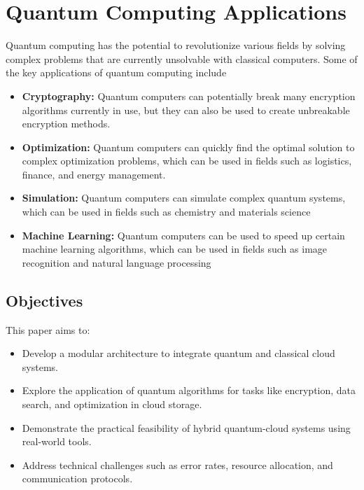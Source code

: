 \documentclass[12pt,a4paper]{article}
\begin{document}
\section{Quantum Computing Applications}
Quantum computing has the potential to revolutionize various fields by solving complex problems that are currently unsolvable
with classical computers. Some of the key applications of quantum computing include
\begin{itemize}
\item \textbf{Cryptography:} Quantum computers can potentially break many encryption algorithms currently in
use, but they can also be used to create unbreakable encryption methods.
\item \textbf{Optimization:} Quantum computers can quickly find the optimal solution to complex
optimization problems, which can be used in fields such as logistics, finance, and energy management.
\item \textbf{Simulation:} Quantum computers can simulate complex quantum systems, which can be used in
fields such as chemistry and materials science
\item \textbf{Machine Learning:} Quantum computers can be used to speed up certain machine 
learning algorithms, which can be used in fields such as image recognition and natural language processing

\end{itemize}


\subsection{Objectives}
This paper aims to:
\begin{itemize}
   \item Develop a modular architecture to integrate quantum and classical cloud systems.
   \item Explore the application of quantum algorithms for tasks like encryption, data search, and optimization in cloud storage.
   \item Demonstrate the practical feasibility of hybrid quantum-cloud systems using real-world tools.
   \item Address technical challenges such as error rates, resource allocation, and communication protocols.
\end{itemize}
\end{document}

